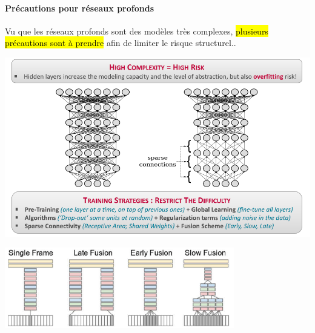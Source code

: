 \documentclass[letterpaper, 12pt]{article}
\newcommand{\alinea}{
\hspace*{0.5cm}}
\begin{document}
				\paragraph{Précautions pour réseaux profonds}
					\alinea Vu que les réseaux profonds sont des modèles très complexes, \hl{plusieurs précautions sont à prendre}
						afin de limiter le risque structurel..
						\begin{center}
							\includegraphics[width=\textwidth]{Images/deep}
						\end{center}
						\begin{center}
							\includegraphics[width=0.75\textwidth]{Images/fusion}
						\end{center}
				\pagebreak
\end{document}

